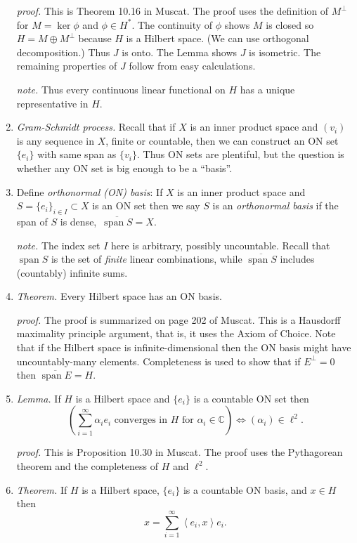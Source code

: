 \documentclass[11pt]{article}
\newcommand{\CC}{\mathbb{C}}
\newcommand{\ip}[2]{\ensuremath{\left<#1,#2\right>}}
\begin{document}
\begin{enumerate}
\emph{proof.}  This is Theorem 10.16 in Muscat.  The proof uses the definition of $M^\perp$ for $M=\ker \phi$ and $\phi \in H^*$.  The continuity of $\phi$ shows $M$ is closed so $H=M\oplus M^\perp$ because $H$ is a Hilbert space.  (We can use orthogonal decomposition.)  Thus $J$ is onto.  The Lemma shows $J$ is isometric.  The remaining properties of $J$ follow from easy calculations.

\emph{note.}  Thus every continuous linear functional on $H$ has a unique representative in $H$.

\item \emph{Gram-Schmidt process.}  Recall that if $X$ is an inner product space and $(v_i)$ is any sequence in $X$, finite or countable, then we can construct an ON set $\{e_i\}$ with same span as $\{v_i\}$.  Thus ON sets are plentiful, but the question is whether any ON set is big enough to be a ``basis''.

\item Define \emph{orthonormal (ON) basis}:  If $X$ is an inner product space and $S=\{e_i\}_{i\in I} \subset X$ is an ON set then we say $S$ is an \emph{orthonormal basis} if the span of $S$ is dense, \,$\overline{\operatorname{span} S} = X$.

\emph{note.}  The index set $I$ here is arbitrary, possibly uncountable.  Recall that $\operatorname{span} S$ is the set of \emph{finite} linear combinations, while $\overline{\operatorname{span} S}$ includes (countably) infinite sums.

\item \emph{Theorem.}  Every Hilbert space has an ON basis.

\emph{proof.}  The proof is summarized on page 202 of Muscat.  This is a Hausdorff maximality principle argument, that is, it uses the Axiom of Choice.  Note that if the Hilbert space is infinite-dimensional then the ON basis might have uncountably-many elements.  Completeness is used to show that if $E^\perp=0$ then $\overline{\operatorname{span} E} = H$.

\item \emph{Lemma.}  If $H$ is a Hilbert space and $\{e_i\}$ is a countable ON set then
    $$\left(\sum_{i=1}^\infty \alpha_i e_i \text{ converges in $H$ for $\alpha_i\in \CC$}\right) \iff (\alpha_i)\in \ell^2.$$

\emph{proof.} This is Proposition 10.30 in Muscat.  The proof uses the Pythagorean theorem and the completeness of $H$ and $\ell^2$.

\item \emph{Theorem.}  If $H$ is a Hilbert space, $\{e_i\}$ is a countable ON basis, and $x\in H$ then
    $$x = \sum_{i=1}^\infty \ip{e_i}{x} e_i.$$


\end{enumerate}
\end{document}
